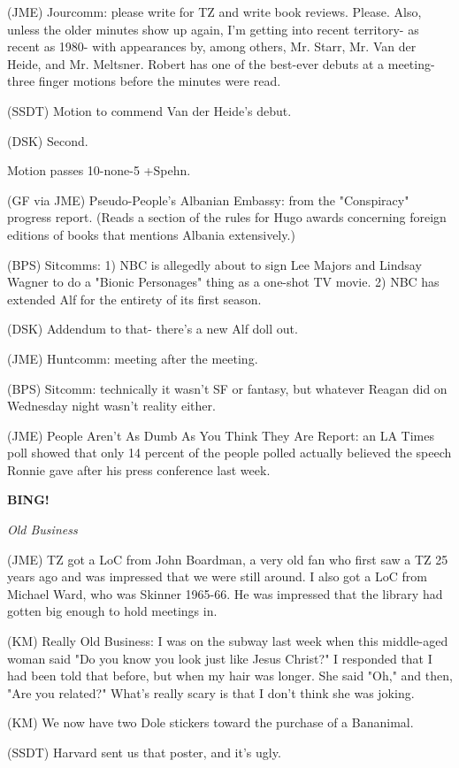 \documentclass[12pt]{article}
\newcommand{\bing}{{\bf BING!} }
\newcommand{\goto}[1]{\bing \vskip 12pt \centerline{{\em{#1}}}}
\begin{document}
(JME) Jourcomm: please write for TZ and write book reviews. Please. Also, unless the older minutes show up again, I'm getting into recent territory- as recent as 1980- with appearances by, among others, Mr. Starr, Mr. Van der Heide, and Mr. Meltsner. Robert has one of the best-ever debuts at a meeting- three finger motions before the minutes were read.

(SSDT) Motion to commend Van der Heide's debut.

(DSK) Second.

Motion passes 10-none-5 +Spehn.

(GF via JME) Pseudo-People's Albanian Embassy: from the "Conspiracy" progress report. (Reads a section of the rules for Hugo awards concerning foreign editions of books that mentions Albania extensively.)

(BPS) Sitcomms: 1) NBC is allegedly about to sign Lee Majors and Lindsay Wagner to do a "Bionic Personages" thing as a one-shot TV movie. 2) NBC has extended Alf for the entirety of its first season.

(DSK) Addendum to that- there's a new Alf doll out.

(JME) Huntcomm: meeting after the meeting.

(BPS) Sitcomm: technically it wasn't SF or fantasy, but whatever Reagan did on Wednesday night wasn't reality either.

(JME) People Aren't As Dumb As You Think They Are Report: an LA Times poll showed that only 14 percent of the people polled actually believed the speech Ronnie gave after his press conference last week.

\goto{Old Business}

(JME) TZ got a LoC from John Boardman, a very old fan who first saw a TZ 25 years ago and was impressed that we were still around. I also got a LoC from Michael Ward, who was Skinner 1965-66. He was impressed that the library had gotten big enough to hold meetings in.

(KM) Really Old Business: I was on the subway last week when this middle-aged woman said "Do you know you look just like Jesus Christ?" I responded that I had been told that before, but when my hair was longer. She said "Oh," and then, "Are you related?" What's really scary is that I don't think she was joking.

(KM) We now have two Dole stickers toward the purchase of a Bananimal.

(SSDT) Harvard sent us that poster, and it's ugly.
\end{document}

